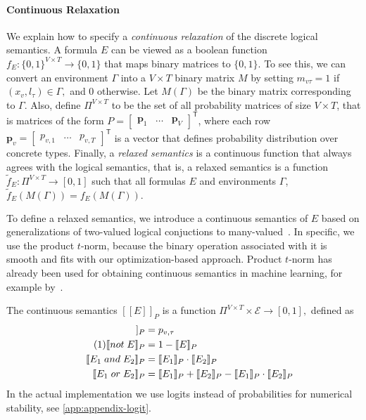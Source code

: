 \documentclass[sigplan,10pt,anonymous]{acmart} %
\newcommand{\qqpi}[2]{[\![#2]\!]_{#1}}
\newcommand\numberthis{\addtocounter{equation}{1}\tag{\theequation}}
\theoremstyle{plain}
\theoremstyle{remark}
\theoremstyle{definition}
\begin{document}
\paragraph{Continuous Relaxation}
We explain how to specify a \emph{continuous relaxation} of the discrete logical semantics.
A formula $E$ can be viewed as a boolean function $f_E: \{0, 1\}^{V \times T} \rightarrow \{0, 1\}$
that maps binary matrices to $\{0, 1\}.$ To see this, we can convert an environment
$\Gamma$ into a $V \times T$ binary matrix $M$ by setting $m_{v\tau} = 1$ if
$(x_v, l_\tau) \in \Gamma,$ and 0 otherwise. Let $M(\Gamma)$ be the binary
matrix corresponding to $\Gamma.$ Also, define $\Pi^{V \times T}$ to be the set
of all probability matrices of size $V \times T$,
that is matrices of the form
$P = \begin{bmatrix} \bm{p}_1 & \ldots & \bm{p}_{V} \end{bmatrix}^\mathsf{T}$,
where each row $\bm{p}_v = \begin{bmatrix} p_{v,1} & \ldots & p_{v,{T}} \end{bmatrix}^\mathsf{T}$
is a vector that defines probability distribution over concrete types.
Finally, a \emph{relaxed semantics} is a continuous function
that always agrees with the logical semantics, that is,
a relaxed semantics is a function
$\tilde{f}_{E} : \Pi^{V \times T}  \rightarrow [0, 1]$
such that all formulas $E$ and environments $\Gamma$,
$\tilde{f}_{E}(M(\Gamma)) = f_E(M(\Gamma)).$

To define a relaxed semantics, we introduce a continuous semantics of $E$ based on generalizations of two-valued logical conjuctions to many-valued~\cite{hajek1998}.
In specific, we use the product $t$-norm, because the binary operation associated with it is smooth and fits with our optimization-based approach.
Product $t$-norm has already been used for obtaining continuous semantics in machine learning, for example by~\citet{rocktaschel15}.

The continuous semantics $\qqpi{P}{E}$ is a function $\Pi^{V \times T} \times \mathcal{E} \rightarrow [0, 1],$
defined as
\begin{align*}
  \qqpi{P}{x_v \mathrel{is} l_\tau} & = p_{v,\tau}                        \\  \numberthis \label{eq:logical}
  \qqpi{P}{\mathrel{not} E}         & = 1-\qqpi{P}{E}                     \\
  \qqpi{P}{E_1 \mathrel{and} E_2}   & = \qqpi{P}{E_1} \cdot \qqpi{P}{E_2} \\
  \qqpi{P}{E_1 \mathrel{or} E_2}    & =
  \qqpi{P}{E_1} + \qqpi{P}{E_2} - \qqpi{P}{E_1}\cdot\qqpi{P}{E_2}
\end{align*}
In the actual implementation we use logits instead of probabilities
for numerical stability, see \cref{app:appendix-logit}.
\end{document}
